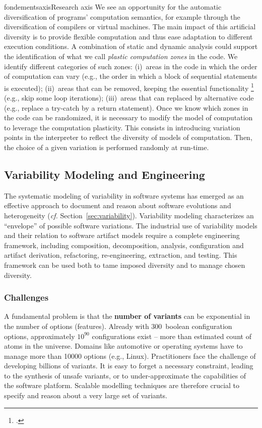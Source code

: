 \documentclass{ra2018}
\begin{document}
\begin{module}{fondements}{axis}{Research axis}
We see an opportunity for the automatic diversification of programs' computation semantics, for example through the diversification of compilers or virtual machines. The main impact of this artificial diversity is to provide flexible computation and thus ease adaptation to different execution conditions. A combination of static and dynamic analysis could support the identification of what we call \emph{plastic computation zones} in the code. We identify different categories of such zones: (i)~areas in the code in which the
order of computation can vary (e.g., the order in which a block of sequential statements is executed); (ii)~areas that can be removed, keeping the essential functionality   \footcite{Sidiroglou-Douskos2011} (e.g., skip some loop iterations); (iii)~areas that can replaced by alternative code (e.g., replace a try-catch by a return statement). Once we know which zones in the code can be randomized, it is necessary to modify the model of computation to leverage the computation plasticity. This consists in introducing variation points in the interpreter
to reflect the diversity of models of computation. Then, the choice of a given variation is performed randomly at run-time.



\subsection{Variability Modeling and Engineering}
\label{sec:axis-spl}

The systematic modeling of variability in software systems has emerged as an effective approach to document and reason about software evolutions and heterogeneity (\textit{cf.} Section~\ref{sec:variability}). Variability modeling characterizes an ``envelope'' of possible software variations. The industrial use of variability models and their relation to software artifact models require a complete engineering framework, including composition, decomposition, analysis, configuration and artifact derivation, refactoring, re-engineering, extraction, and testing.  This framework can be used both to tame imposed diversity and to manage chosen diversity.  



\subsubsection*{Challenges} 

A fundamental problem is that the \textbf{number of variants} can be exponential in the number of options (features). 
Already with 300~boolean configuration options, approximately $10^{90}$ configurations exist -- more than estimated count of atoms in the universe. Domains like automotive or operating systems have to manage more than 10000 options (e.g., Linux). Practitioners face the challenge of developing billions of variants. It is easy to forget a necessary constraint, leading to the synthesis of unsafe variants, or to under-approximate the capabilities of the software platform. Scalable modelling techniques are therefore crucial to specify and reason about a very large set of variants.


\end{module}
\end{document}
